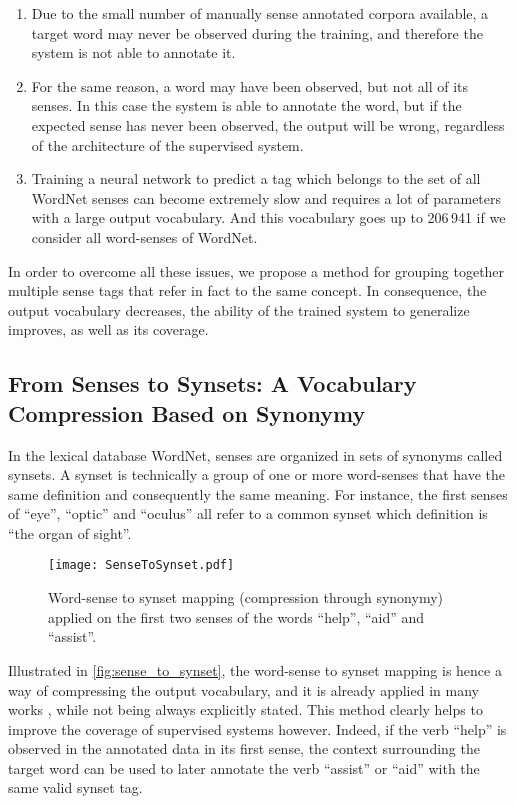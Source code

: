 \documentclass[11pt]{article}
\newcommand{\citep}[1]{\cite{#1}}
\begin{document}
\begin{enumerate}[leftmargin=*,topsep=0pt,itemsep=0pt,parsep=0pt,partopsep=0pt]
    \item Due to the small number of manually sense annotated corpora available, a target word may never be observed during the training, and therefore the system is not able to annotate it.
    \item For the same reason, a word may have been observed, but not all of its senses. In this case the system is able to annotate the word, but if the expected sense has never been observed, the output will be wrong, regardless of the architecture of the supervised system.
    \item Training a neural network 
to predict a tag which belongs to the set of all WordNet senses can become 
    extremely 
    slow and requires a lot of parameters with a large output vocabulary. And this vocabulary goes up to 206\,941 if we consider all word-senses of WordNet.
\end{enumerate}

\noindent In order to overcome all these issues, we propose a method for grouping together multiple sense tags that refer in fact to the same concept.
In consequence, 
the output vocabulary decreases, the ability of the trained system to generalize improves, as well as its coverage.



\subsection{From Senses to Synsets: A Vocabulary Compression Based on Synonymy}

In the lexical database WordNet, senses are organized in sets of synonyms called synsets. A synset is technically a group of one or more word-senses that have the same definition and consequently the same meaning. For instance, the first senses of ``eye'', ``optic'' and ``oculus'' all refer to a common synset which definition is ``the organ of sight''.



\begin{figure}[htbp]
\centering
\texttt{[image: SenseToSynset.pdf]}
\caption{Word-sense to synset mapping (compression through synonymy) applied on the first two senses of the words ``help'', ``aid'' and ``assist''.}
\label{fig:sense_to_synset}
\end{figure}

Illustrated in \autoref{fig:sense_to_synset}, the word-sense to synset mapping is hence a way of compressing the output vocabulary, and it is already applied in many works \citep{yuan_2016,minh2018}, while not being always explicitly stated. This method clearly helps to improve the coverage of supervised systems however. Indeed, if the verb ``help'' is observed in the annotated data in its first sense, 
the context surrounding the target word can be used to later annotate the verb ``assist'' or ``aid'' with the same valid synset tag.
\end{document}
